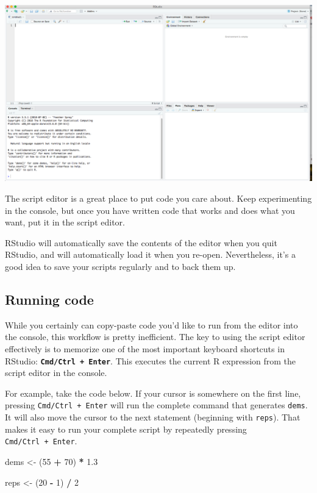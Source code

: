 \documentclass[]{book}
\newenvironment{Shaded}{\begin{snugshade}}{\end{snugshade}}
\newcommand{\DecValTok}[1]{\textcolor[rgb]{0.00,0.00,0.81}{#1}}
\newcommand{\FloatTok}[1]{\textcolor[rgb]{0.00,0.00,0.81}{#1}}
\newcommand{\NormalTok}[1]{#1}
\newcommand{\OperatorTok}[1]{\textcolor[rgb]{0.81,0.36,0.00}{\textbf{#1}}}
\newcommand{\StringTok}[1]{\textcolor[rgb]{0.31,0.60,0.02}{#1}}
\begin{document}
\begin{center}\includegraphics[width=0.7\linewidth]{img/4-panes} \end{center}

The script editor is a great place to put code you care about. Keep experimenting in the console, but once you have written code that works and does what you want, put it in the script editor.

RStudio will automatically save the contents of the editor when you quit RStudio, and will automatically load it when you re-open. Nevertheless, it's a good idea to save your scripts regularly and to back them up.

\hypertarget{running-code}{%
\subsection{Running code}\label{running-code}}

While you certainly can copy-paste code you'd like to run from the editor into the console, this workflow is pretty inefficient. The key to using the script editor effectively is to memorize one of the most important keyboard shortcuts in RStudio: \textbf{\texttt{Cmd/Ctrl\ +\ Enter}}. This executes the current R expression from the script editor in the console.

For example, take the code below. If your cursor is somewhere on the first line, pressing \texttt{Cmd/Ctrl\ +\ Enter} will run the complete command that generates \texttt{dems}. It will also move the cursor to the next statement (beginning with \texttt{reps}). That makes it easy to run your complete script by repeatedly pressing \texttt{Cmd/Ctrl\ +\ Enter}.

\begin{Shaded}
\begin{Highlighting}[]
\NormalTok{dems <-}\StringTok{ }\NormalTok{(}\DecValTok{55} \OperatorTok{+}\StringTok{ }\DecValTok{70}\NormalTok{) }\OperatorTok{*}\StringTok{ }\FloatTok{1.3}

\NormalTok{reps <-}\StringTok{ }\NormalTok{(}\DecValTok{20} \OperatorTok{-}\StringTok{ }\DecValTok{1}\NormalTok{) }\OperatorTok{/}\StringTok{ }\DecValTok{2}
\end{Highlighting}
\end{Shaded}
\end{document}
